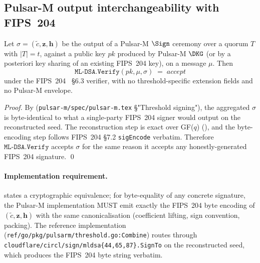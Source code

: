 
\subsection*{Pulsar-M output interchangeability with FIPS~204}

\begin{theorem}
\label{thm:pulsar-m-output-interchange}
Let $\sigma = (\tilde c, \mathbf{z}, \mathbf{h})$ be the output of a
Pulsar-M $\Sign$ ceremony over a quorum $T$ with $|T| = t$, against a
public key $\mathit{pk}$ produced by Pulsar-M $\DKG$ (or by a
posteriori key sharing of an existing FIPS~204 key), on a message
$\mu$. Then
\[
  \mathtt{ML\text{-}DSA.Verify}(\mathit{pk}, \mu, \sigma) \;=\; \mathit{accept}
\]
under the FIPS~204~\cite{nist-fips204} \S6.3 verifier, with no
threshold-specific extension fields and no Pulsar-M envelope.
\end{theorem}

\begin{proof}
By  (\texttt{pulsar-m/spec/pulsar-m.tex}
\S "Threshold signing"), the aggregated $\sigma$ is byte-identical
to what a single-party FIPS~204 signer would output on the
reconstructed seed. The reconstruction step is exact over GF($q$)
(), and the byte-encoding step
follows FIPS~204 \S7.2 \texttt{sigEncode} verbatim. Therefore
$\mathtt{ML\text{-}DSA.Verify}$ accepts $\sigma$ for the same reason
it accepts any honestly-generated FIPS~204 signature. \qed
\end{proof}

\paragraph{Implementation requirement.}
 states a cryptographic
equivalence; for byte-equality of any concrete signature, the
Pulsar-M implementation MUST emit exactly the FIPS~204 byte
encoding of $(\tilde c, \mathbf{z}, \mathbf{h})$ with the same
canonicalisation (coefficient lifting, sign convention, packing).
The reference implementation
(\texttt{ref/go/pkg/pulsarm/threshold.go:Combine}) routes through
\texttt{cloudflare/circl/sign/mldsa\{44,65,87\}.SignTo} on the
reconstructed seed, which produces the FIPS~204 byte string verbatim.

